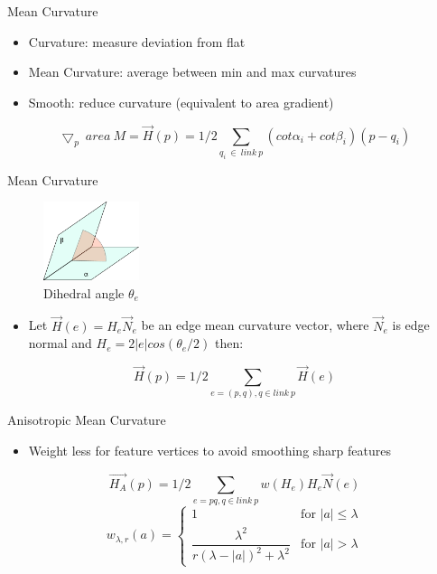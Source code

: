 \documentclass{beamer}
\begin{document}
\begin{frame}{Mean Curvature}
\begin{figure}[htbp]
\begin{minipage}[b]{0.4\linewidth}
    \label{fig:cotangent}
  \end{minipage}
\end{figure}
\begin{itemize}
	\item Curvature: measure deviation from flat
	\item Mean Curvature: average between min and max curvatures
	\item Smooth: reduce curvature (equivalent to area gradient)
\end{itemize}
\begin{equation*}
\bigtriangledown_p\ area\ M = \vec{H}(p) = 1/2\sum\limits_{q_i\ \in\ link\ p}{(cot\alpha_{i} + cot\beta_{i})(p-q_i)}
\end{equation*}
\end{frame}

\begin{frame}{Mean Curvature}
\begin{figure}[htb]
\centering
\includegraphics[width=0.25\textwidth]{Dihedral_angle.png}
\caption{Dihedral angle $\theta_e$}
\label{fig:dihedral}
\end{figure}
\begin{itemize}
	\item Let $\vec{H}(e) = H_e \vec{N}_e$ be an edge mean curvature vector, where $\vec{N}_e$ is edge normal and $H_e = 2|e|cos(\theta_e/2)$ then:
\end{itemize}
\begin{equation*}
\vec{H}(p) = 1/2\sum\limits_{e=(p, q), q \in link\ p}{\vec{H}(e)}
\end{equation*}
\end{frame}

\begin{frame}{Anisotropic Mean Curvature}
\begin{itemize}
	\item Weight less for feature vertices to avoid smoothing sharp features
\end{itemize}
\begin{equation*}
\vec{H_A}(p) = 1/2\sum\limits_{e=pq, q \in link\ p}{w(H_e)H_e \vec{N}(e)}
\end{equation*}
\begin{equation*}
w_{\lambda, r}(a) = 
\begin{cases}
1 & \text{for } |a| \leq \lambda \\
\dfrac{\lambda^2}{r(\lambda - |a|)^2+\lambda^2} & \text{for } |a| > \lambda
\end{cases}
\end{equation*}
\end{frame}
\end{document}
